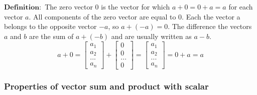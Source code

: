 \documentclass[11pt]{article}
\begin{document}
    $\mathbf{Definition:}$ The zero vector $0$ is the vector for which $a + 0 = 0 + a = a$
for each vector $a$. All components of the zero vector are equal to $0$. Each
the vector a belongs to the opposite vector $-a$, so $a + (-a) = 0$. The difference
the vectors $a$ and $b$ are the sum of $a + (-b)$ and are usually written as $a - b$.
$$$$
$$
 a + 0 = \begin{bmatrix}a_1 \\ a_2 \\ ... \\ a_n\end{bmatrix} + 
         \begin{bmatrix} 0 \\ 0 \\ ... \\ 0\end{bmatrix} = 
         \begin{bmatrix} a_1 \\ a_2 \\ ... \\ a_n\end{bmatrix} = 0 + a = a
$$

    
    \hypertarget{properties-of-vector-sum-and-product-with-scalar}{%
\subsubsection{Properties of vector sum and product with
scalar}\label{properties-of-vector-sum-and-product-with-scalar}}
\end{document}
